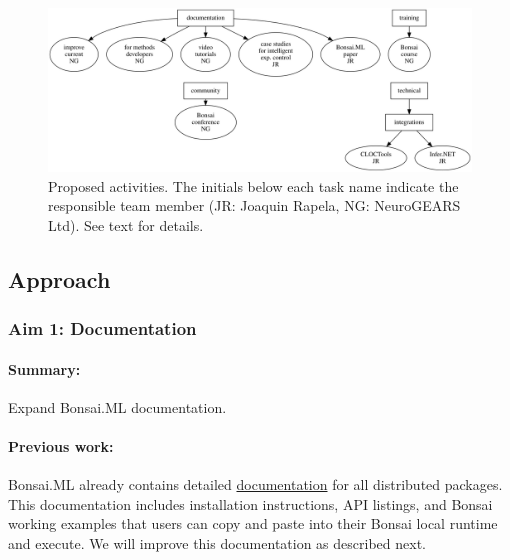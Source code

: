 
\begin{figure}
    \centering
    \includegraphics[width=6in]{activitiesGraphs/activities_larger.png}

    \caption{Proposed activities. The initials below each task name indicate
    the responsible team member (JR: Joaquin Rapela, NG: NeuroGEARS Ltd). See
    text for details.}

\end{figure}

\subsection{Approach}

\subsubsection{Aim 1: Documentation}

\paragraph{Summary:} Expand Bonsai.ML documentation.

\paragraph{Previous work:} Bonsai.ML already contains detailed
\href{https://bonsai-rx.org/machinelearning/index.html}{documentation} for all
distributed packages. This documentation includes installation instructions,
API listings, and Bonsai working examples that users can copy and paste into
their Bonsai local runtime and execute. We will improve this documentation as
described next.

